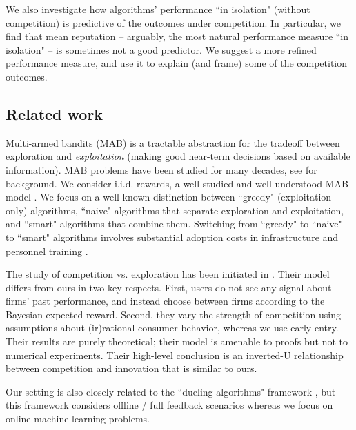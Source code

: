 \documentclass[../competing_bandits_with_appendix.tex]{subfiles}
\begin{document}
We also investigate how algorithms' performance ``in isolation" (without competition) is predictive of the outcomes under competition. In particular, we find that mean reputation -- arguably, the most natural performance measure ``in isolation" -- is sometimes not a good predictor. We suggest a more refined performance measure, and use it to explain (and frame) some of the competition outcomes.


\subsection{Related work}

 Multi-armed bandits (MAB) is a tractable abstraction for the tradeoff between exploration and \emph{exploitation} (making good near-term decisions based on available information). MAB problems have been studied for many decades, see \cite{Bubeck-survey12} for background. We consider i.i.d. rewards, a well-studied and well-understood MAB model \cite{bandits-ucb1}. We focus on a well-known distinction between ``greedy" (exploitation-only) algorithms, ``naive" algorithms that separate exploration and exploitation, and ``smart" algorithms that combine them. Switching from ``greedy" to ``naive" to ``smart" algorithms involves substantial adoption costs in infrastructure and personnel training \cite{MWT-WhitePaper-2016,DS-arxiv}.

The study of competition vs. exploration has been initiated in \cite{CompetingBandits-itcs16}. Their model differs from ours in two key respects. First, users do not see any signal about firms' past performance, and instead choose between firms according to the Bayesian-expected reward. Second, they vary the strength of competition using assumptions about (ir)rational consumer behavior, whereas we use early entry. Their results are purely theoretical; their model is amenable to proofs but not to numerical experiments. Their high-level conclusion is an inverted-U relationship between competition and innovation that is similar to ours.

Our setting is also closely related to the ``dueling algorithms" framework \cite{DuelingAlgs-stoc11}, but this framework considers offline / full feedback scenarios whereas we focus on online machine learning problems.

\end{document}
